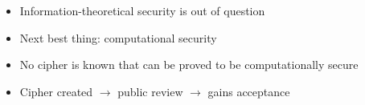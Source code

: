 \begin{remark}
    \begin{itemize}
        \item Information-theoretical security is out of question
        \item Next best thing: computational security
        \item No cipher is known that can be proved to be computationally secure
        \item Cipher created $\rightarrow$ public review $\rightarrow$ gains acceptance
    \end{itemize}
\end{remark}